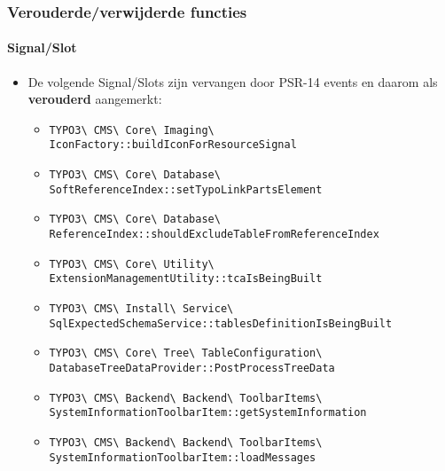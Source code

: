 \begin{frame}[fragile]
	\frametitle{Verouderde/verwijderde functies}
	\framesubtitle{Signal/Slot}

	\lstset{basicstyle=\tiny\ttfamily}

	\begin{itemize}
		\item De volgende Signal/Slots zijn vervangen door PSR-14 events en daarom als \textbf{verouderd} aangemerkt:
			\newline

			\begin{itemize}\tiny
				\item \texttt{TYPO3\textbackslash
					CMS\textbackslash
					Core\textbackslash
					Imaging\textbackslash
					IconFactory::buildIconForResourceSignal}
					\newline
				\item \texttt{TYPO3\textbackslash
					CMS\textbackslash
					Core\textbackslash
					Database\textbackslash
					SoftReferenceIndex::setTypoLinkPartsElement}
					\newline
				\item \texttt{TYPO3\textbackslash
					CMS\textbackslash
					Core\textbackslash
					Database\textbackslash
					ReferenceIndex::shouldExcludeTableFromReferenceIndex}
					\newline
				\item \texttt{TYPO3\textbackslash
					CMS\textbackslash
					Core\textbackslash
					Utility\textbackslash
					ExtensionManagementUtility::tcaIsBeingBuilt}
					\newline
				\item \texttt{TYPO3\textbackslash
					CMS\textbackslash
					Install\textbackslash
					Service\textbackslash
					SqlExpectedSchemaService::tablesDefinitionIsBeingBuilt}
					\newline
				\item \texttt{TYPO3\textbackslash
					CMS\textbackslash
					Core\textbackslash
					Tree\textbackslash
					TableConfiguration\textbackslash
					DatabaseTreeDataProvider::PostProcessTreeData}
					\newline
				\item \texttt{TYPO3\textbackslash
					CMS\textbackslash
					Backend\textbackslash
					Backend\textbackslash
					ToolbarItems\textbackslash
					SystemInformationToolbarItem::getSystemInformation}
					\newline
				\item \texttt{TYPO3\textbackslash
					CMS\textbackslash
					Backend\textbackslash
					Backend\textbackslash
					ToolbarItems\textbackslash
					SystemInformationToolbarItem::loadMessages}

			\end{itemize}

	\end{itemize}

\end{frame}

